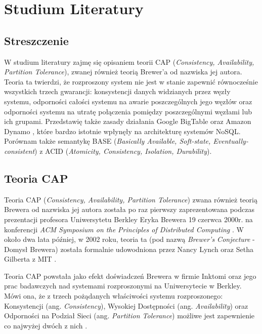 \chapter{Studium Literatury}

\section*{Streszczenie}

W studium literatury zajmę się opisaniem teorii CAP \cite{brewers-conjecture} (\emph{Consistency, Availability, Partition Tolerance}), zwanej również teorią Brewer'a od nazwiska jej autora. 
Teoria ta twierdzi, że rozproszony system nie jest w stanie zapewnić równocześnie wszystkich trzech gwarancji: konsystencji danych widzianych przez węzły systemu, odporności całości systemu na awarie poszczególnych jego węzłów oraz odporności systemu na utratę połączenia pomiędzy poszczególnymi węzłami lub ich grupami. 
Przedstawię także zasady działania Google BigTable \cite{google-bigtable} oraz Amazon Dynamo \cite{amazon-dynamo}, które bardzo istotnie wpłynęły na architekturę systemów NoSQL. 
Porównam także semantykę BASE (\emph{Basically Available, Soft-state, Eventually-consistent}) z ACID (\emph{Atomicity, Consistency, Isolation, Durability}).

\section{Teoria CAP}

Teoria CAP (\emph{Consistency, Availability, Partition Tolerance}) zwana również teorią Brewera od nazwiska jej autora została po raz pierwszy zaprezentowana podczas prezentacji profesora Uniwersytetu Berkley Eryka Brewera 19 czerwca 2000r. na konferencji \emph{ACM Symposium on the Principles of Distributed Computing} \cite{podc-keynote}. 
W około dwa lata później, w 2002 roku, teoria ta (pod nazwą \emph{Brewer's Conjecture} - Domysł Brewera) została formalnie udowodniona przez Nancy Lynch oraz Setha Gilberta z MIT \cite{brewers-conjecture}.

Teoria CAP powstała jako efekt doświadczeń Brewera w firmie Inktomi oraz jego prac badawczych nad systemami rozproszonymi na Uniwersytecie w Berkley. 
Mówi ona, że z trzech pożądanych właściwości systemu rozproszonego: Konsystencji (ang. \emph{Consistency}), Wysokiej Dostępności (ang. \emph{Availability}) oraz Odporności na Podział Sieci (ang. \emph{Partition Tolerance}) możliwe jest zapewnienie co najwyżej dwóch z nich \cite{browne-cap-theorem}.

